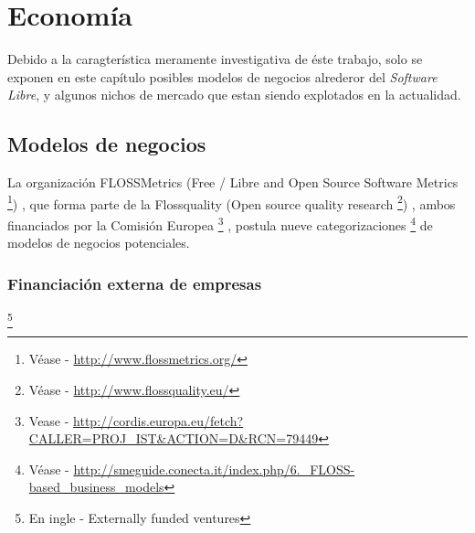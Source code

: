\chapter{Econom\'ia}
%
%
Debido a la caragter\'istica meramente investigativa de \'este trabajo, solo
se exponen en este cap\'itulo posibles modelos de negocios alrederor del
\emph{Software Libre}, y algunos nichos de mercado que estan siendo explotados
en la actualidad.\\

\section{Modelos de negocios}
La organizaci\'on FLOSSMetrics 
(Free / Libre and Open Source Software Metrics
\footnote{V\'ease - \url{http://www.flossmetrics.org/}})
, que forma parte de la Flossquality (Open source quality research
\footnote{V\'ease - \url{http://www.flossquality.eu/}})
, ambos financiados por la Comisi\'on Europea
\footnote{Vease -
\url{http://cordis.europa.eu/fetch?CALLER=PROJ_IST&ACTION=D&RCN=79449}}
, postula nueve categorizaciones
\footnote{V\'ease -
\url{http://smeguide.conecta.it/index.php/6._FLOSS-based_business_models}} 
de modelos de negocios potenciales.


\subsection{Financiaci\'on externa de empresas}\footnote{En ingle - Externally
funded ventures}
%





